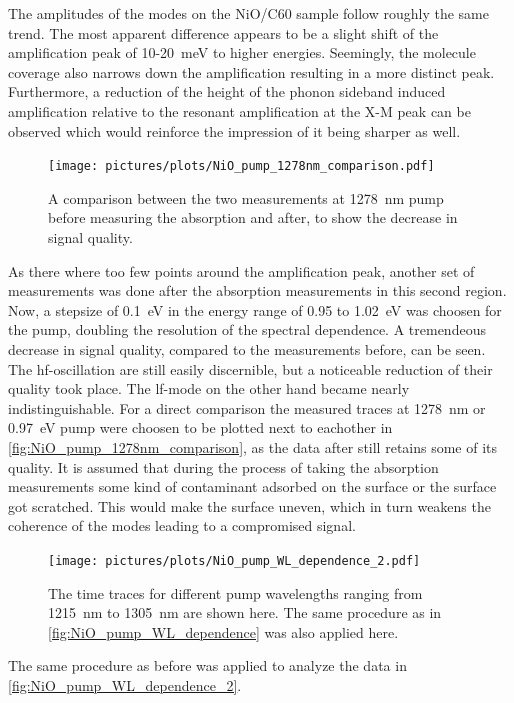 The amplitudes of the modes on the NiO/C60 sample follow roughly the same trend.
The most apparent difference appears to be a slight shift of the amplification peak of 10-\qty{20}{meV} to higher energies.
Seemingly, the molecule coverage also narrows down the amplification resulting in a more distinct peak.
Furthermore, a reduction of the height of the phonon sideband induced amplification relative to the resonant amplification at the X-M peak can be observed which would reinforce the impression of it being sharper as well.

\begin{figure}[ht]
    \centering
    \texttt{[image: pictures/plots/NiO\_pump\_1278nm\_comparison.pdf]}
    \caption{A comparison between the two measurements at \qty{1278}{nm} pump before measuring the absorption and after, to show the decrease in signal quality.}
    \label{fig:NiO_pump_1278nm_comparison}
\end{figure}
As there where too few points around the amplification peak, another set of measurements was done after the absorption measurements in this second region.
Now, a stepsize of \qty{0.1}{eV} in the energy range of 0.95 to \qty{1.02}{eV} was choosen for the pump, doubling the resolution of the spectral dependence.
A tremendeous decrease in signal quality, compared to the measurements before, can be seen.
The hf-oscillation are still easily discernible, but a noticeable reduction of their quality took place.
The lf-mode on the other hand became nearly indistinguishable.
For a direct comparison the measured traces at \qty{1278}{nm} or \qty{0.97}{eV} pump were choosen to be plotted next to eachother in \autoref{fig:NiO_pump_1278nm_comparison}, as the data after still retains some of its quality.
It is assumed that during the process of taking the absorption measurements some kind of contaminant adsorbed on the surface or the surface got scratched.
This would make the surface uneven, which in turn weakens the coherence of the modes leading to a compromised signal.
\begin{figure}[ht]
    \centering
    \texttt{[image: pictures/plots/NiO\_pump\_WL\_dependence\_2.pdf]}
    \caption{The time traces for different pump wavelengths ranging from \qty{1215}{nm} to \qty{1305}{nm} are shown here. The same procedure as in \autoref{fig:NiO_pump_WL_dependence} was also applied here.}
    \label{fig:NiO_pump_WL_dependence_2.pdf}
\end{figure}
The same procedure as before was applied to analyze the data in \autoref{fig:NiO_pump_WL_dependence_2}.
